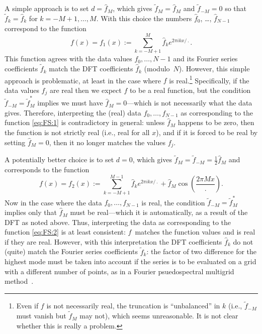 \documentclass[12pt]{article}
\newcommand{\CC}[1]{{#1}^{*}}           %
\newcommand{\fc}[1]{\widetilde{#1}} %
\newcommand{\dfc}[1]{\widehat{#1}}  %
\begin{document}
A simple approach is to set $d=\dfc{f}_{M}$, which gives $\fc{f}_{M} =
\dfc{f}_{M}$ and $\fc{f}_{-M} = 0$ so that $\fc{f}_k=\dfc{f}_k$ for
$k=-M+1,\dots,M$.  With this choice the numbers $\dfc{f}_0$, \dots,
$\dfc{f}_{N-1}$ correspond to the function
\begin{equation}
   f(x) = f_1(x) := \sum_{k=-M+1}^{M} \dfc{f}_k e^{2\pi ikx/\period} .
\label{eq:FS:1}
\end{equation}
This function agrees with the data values $f_0,\dots,N-1$ and its Fourier
series coefficients $\fc{f}_k$ match the DFT coefficients $\dfc{f}_k$
(modulo~$N$).  However, this simple approach is problematic, at least in the
case where $f$ is real.\footnote{Even if $f$ is not necessarily real, the
truncation is ``unbalanced'' in $k$ (i.e., $\fc{f}_{-M}$ must vanish but
$\fc{f}_{M}$ may not), which seems unreasonable.  It is not clear whether this
is really a problem.}  Specifically, if the data values $f_j$ are real then we
expect $f$ to be a real function, but the condition $\fc{f}_{-M} =
\CC{\fc{f}}_{M}$ implies we must have $\dfc{f}_{M}=0$---which is not
necessarily what the data gives.  Therefore, interpreting the (real) data
$f_0,\dots,f_{N-1}$ as corresponding to the function \eqref{eq:FS:1} is
contradictory in general:  unless $\dfc{f}_{M}$ happens to be zero, then the
function is not strictly real (i.e., real for all $x$), and if it is forced to
be real by setting $\dfc{f}_{M}=0$, then it no longer matches the values
$f_j$.  

A potentially better choice is to set $d=0$, which gives $\fc{f}_{M} =
\fc{f}_{-M} = \frac12\dfc{f}_{M}$ and corresponds to the function
\begin{equation}
   f(x) = f_2(x) := \sum_{k=-M+1}^{M-1} \dfc{f}_k e^{2\pi ikx/\period}
        + \dfc{f}_{M}\cos\left(\frac{2\pi Mx}{\period}\right) .
\label{eq:FS:2}
\end{equation}
Now in the case where the data $f_0,\dots,f_{N-1}$ is real, the condition
$\fc{f}_{-M} = \CC{\fc{f}}_{M}$ implies only that $\dfc{f}_{M}$ must be
real---which it is automatically, as a result of the DFT as noted above.
Thus, interpreting the data as corresponding to the function \eqref{eq:FS:2}
is at least consistent:  $f$~matches the function values and is real if they
are real.  However, with this interpretation the DFT coefficients $\dfc{f}_k$
do not (quite) match the Fourier series coefficients $\fc{f}_k$:  the factor
of two difference for the highest mode must be taken into account if the
series is to be evaluated on a grid with a different number of points, as in a
Fourier psuedospectral multigrid method~\cite{BrandtEtAl84}.
\end{document}
